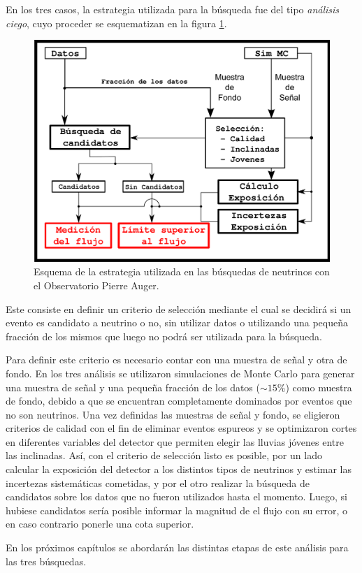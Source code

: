En los tres casos, la estrategia utilizada para la búsqueda fue del tipo \emph{análisis ciego}, cuyo proceder se esquematizan en la figura \ref{fig:strAuger}.
	\begin{figure}[ht!]
		\centering
		\includegraphics[width=\textwidth]{./fig/estrategiaAuger/analysisSchema}
		\caption{\label{fig:strAuger}
		Esquema de la estrategia utilizada en las búsquedas de neutrinos con el Observatorio Pierre Auger.
		}
	\end{figure}
Este consiste en definir un criterio de selección mediante el cual se decidirá si un evento es candidato a neutrino o no, sin utilizar datos o utilizando una pequeña fracción de los mismos que luego no podrá ser utilizada para la búsqueda.

Para definir este criterio es necesario contar con una muestra de señal y otra de fondo.
En los tres análisis se utilizaron simulaciones de Monte Carlo para generar una muestra de señal y una pequeña fracción de los datos ($\sim15\%$) como muestra de fondo, debido a que se encuentran completamente dominados por eventos que no son neutrinos.
Una vez definidas las muestras de señal y fondo, se eligieron criterios de calidad con el fin de eliminar eventos espureos y se optimizaron cortes en diferentes variables del detector que permiten elegir las lluvias jóvenes entre las inclinadas.
Así, con el criterio de selección listo es posible, por un lado calcular la exposición del detector a los distintos tipos de neutrinos y estimar las incertezas sistemáticas cometidas, y por el otro realizar la búsqueda de candidatos sobre los datos que no fueron utilizados hasta el momento.
Luego, si hubiese candidatos sería posible informar la magnitud de el flujo con su error, o en caso contrario ponerle una cota superior.

En los próximos capítulos se abordarán las distintas etapas de este análisis para las tres búsquedas.

